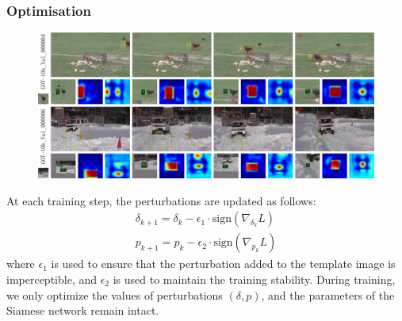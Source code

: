 \documentclass{article}
\begin{document}
\subsubsection{Optimisation}

\begin{figure}[t]
\centering
\includegraphics[width=1\textwidth]{images/vis_2.pdf}
\label{fig:vis}
\end{figure}

At each training step, the perturbations are updated as follows:
\begin{gather}
\delta_{k+1} = \delta_{k} - \epsilon_1 \cdot \text{sign}(\nabla_{\delta_k}L)\\
p_{k+1} = p_{k} - \epsilon_2 \cdot \text{sign}(\nabla_{p_k}L)
\end{gather}
where $\epsilon_1$ is used to ensure that the perturbation added to the template image is imperceptible, and $\epsilon_2$ is used to maintain the training stability.
During training, we only optimize the values of perturbations $(\delta, p)$, and the parameters of the Siamese network remain intact.

\begin{table}[hbtp]
\centering
{}
\caption{Attack results on several benchmarks.}
\label{tab:benchmark results}
\end{table}
\end{document}

